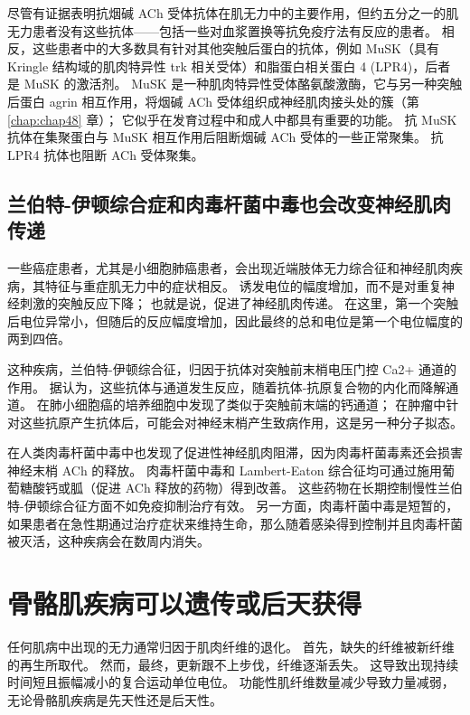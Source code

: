尽管有证据表明抗烟碱 ACh 受体抗体在肌无力中的主要作用，但约五分之一的肌无力患者没有这些抗体——包括一些对血浆置换等抗免疫疗法有反应的患者。
相反，这些患者中的大多数具有针对其他突触后蛋白的抗体，例如 MuSK（具有 Kringle 结构域的肌肉特异性 trk 相关受体）和脂蛋白相关蛋白 4 (LPR4)，后者是 MuSK 的激活剂。
MuSK 是一种肌肉特异性受体酪氨酸激酶，它与另一种突触后蛋白 agrin 相互作用，将烟碱 ACh 受体组织成神经肌肉接头处的簇（第 \ref{chap:chap48} 章）；
它似乎在发育过程中和成人中都具有重要的功能。
抗 MuSK 抗体在集聚蛋白与 MuSK 相互作用后阻断烟碱 ACh 受体的一些正常聚集。
抗 LPR4 抗体也阻断 ACh 受体聚集。



\subsection{兰伯特-伊顿综合症和肉毒杆菌中毒也会改变神经肌肉传递}

一些癌症患者，尤其是小细胞肺癌患者，会出现近端肢体无力综合征和神经肌肉疾病，其特征与重症肌无力中的症状相反。
诱发电位的幅度增加，而不是对重复神经刺激的突触反应下降；
也就是说，促进了神经肌肉传递。
在这里，第一个突触后电位异常小，但随后的反应幅度增加，因此最终的总和电位是第一个电位幅度的两到四倍。


这种疾病，兰伯特-伊顿综合征，归因于抗体对突触前末梢电压门控 Ca2+ 通道的作用。
据认为，这些抗体与通道发生反应，随着抗体-抗原复合物的内化而降解通道。
在肺小细胞癌的培养细胞中发现了类似于突触前末端的钙通道；
在肿瘤中针对这些抗原产生抗体后，可能会对神经末梢产生致病作用，这是另一种分子拟态。


在人类肉毒杆菌中毒中也发现了促进性神经肌肉阻滞，因为肉毒杆菌毒素还会损害神经末梢 ACh 的释放。
肉毒杆菌中毒和 Lambert-Eaton 综合征均可通过施用葡萄糖酸钙或胍（促进 ACh 释放的药物）得到改善。
这些药物在长期控制慢性兰伯特-伊顿综合征方面不如免疫抑制治疗有效。
另一方面，肉毒杆菌中毒是短暂的，如果患者在急性期通过治疗症状来维持生命，那么随着感染得到控制并且肉毒杆菌被灭活，这种疾病会在数周内消失。



\section{骨骼肌疾病可以遗传或后天获得}

任何肌病中出现的无力通常归因于肌肉纤维的退化。
首先，缺失的纤维被新纤维的再生所取代。
然而，最终，更新跟不上步伐，纤维逐渐丢失。
这导致出现持续时间短且振幅减小的复合运动单位电位。
功能性肌纤维数量减少导致力量减弱，无论骨骼肌疾病是先天性还是后天性。



